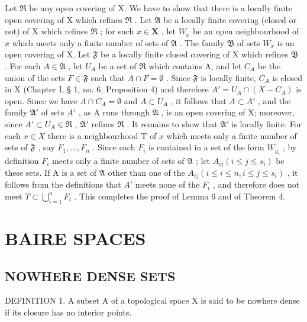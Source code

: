 Let \(\mathfrak{R}\) be any open covering of X. We have to show that there is a locally finite open covering of X which refines \(\mathfrak{R}\) . Let \(\mathfrak{A}\) be a locally finite covering (closed or not) of X which refines \(\mathfrak{R}\) ; for each \(x \in \mathbf{X}\) , let \(W_x\) be an open neighbourhood of \(x\) which meets only a finite number of sets of \(\mathfrak{A}\) . The family \(\mathfrak{B}\) of sets \(W_x\) is an open covering of X. Let \(\mathfrak{F}\) be a locally finite closed covering of X which refines \(\mathfrak{B}\) . For each \(A \in \mathfrak{A}\) , let \(U_A\) be a set of \(\mathfrak{R}\) which contains A, and let \(C_A\) be the union of the sets \(F \in \mathfrak{F}\) such that \(A \cap F = \emptyset\) . Since \(\mathfrak{F}\) is locally finite, \(C_A\) is closed in X (Chapter I, § 1, no. 6, Proposition 4) and therefore \(A' = U_A \cap (X - C_A)\) is open. Since we have \(A \cap C_A = \emptyset\) and \(A \subset U_A\) , it follows that \(A \subset A'\) , and the family \(\mathfrak{A}'\) of sets \(A'\) , as A runs through \(\mathfrak{A}\) , is an open covering of X; moreover, since \(A' \subset U_A \in \mathfrak{R}\) , \(\mathfrak{A}'\) refines \(\mathfrak{R}\) . It remains to show that \(\mathfrak{A}'\) is locally finite. For each \(x \in X\) there is a neighbourhood T of \(x\) which meets only a finite number of sets of \(\mathfrak{F}\) , say \(F_1, \ldots, F_n\) . Since each \(F_i\) is contained in a set of the form \(W_{y_i}\) , by definition \(F_i\) meets only a finite number of sets of \(\mathfrak{A}\) ; let \(A_{ij} (i \leqslant j \leqslant s_i)\) be these sets. If A is a set of \(\mathfrak{A}\) other than one of the \(A_{ij} (i \leqslant i \leqslant n, i \leqslant j \leqslant s_i)\) , it follows from the definitions that \(A'\) meets none of the \(F_i\) , and therefore does not meet \(T \subset \bigcup_{i=1}^{n} F_i\) . This completes the proof of Lemma 6 and of Theorem 4.

\section{BAIRE SPACES}

\subsection{NOWHERE DENSE SETS}

DEFINITION 1. A subset A of a topological space X is said to be nowhere dense if its closure has no interior points.

